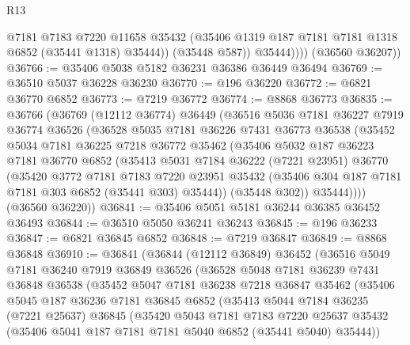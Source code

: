 \begin{lexlean}{R13}
\begin{coremodule}
                  @7181
                  @7183
                  @7220
                  @11658
                  @35432
                  (@35406 @1319 @187 @7181 @7181 @1318 @6852 (@35441 @1318) @35444))
                (@35448 @587))
              @35444))))
      (@36560 @36207))
@36766 := @35406 @5038 @5182 @36231 @36386 @36449 @36494
@36769 := @36510 @5037 @36228 @36230
@36770 := @196 @36220
@36772 := @6821 @36770 @6852
@36773 := @7219 @36772
@36774 := @8868 @36773
@36835 := @36766
    (@36769
      (@12112 @36774)
      @36449
      (@36516
        @5036
        @7181
        @36227
        @7919
        @36774
        @36526
        (@36528
          @5035
          @7181
          @36226
          @7431
          @36773
          @36538
          (@35452
            @5034
            @7181
            @36225
            @7218
            @36772
            @35462
            (@35406
              @5032
              @187
              @36223
              @7181
              @36770
              @6852
              (@35413
                @5031
                @7184
                @36222
                (@7221 @23951)
                @36770
                (@35420
                  @3772
                  @7181
                  @7183
                  @7220
                  @23951
                  @35432
                  (@35406 @304 @187 @7181 @7181 @303 @6852 (@35441 @303) @35444))
                (@35448 @302))
              @35444))))
      (@36560 @36220))
@36841 := @35406 @5051 @5181 @36244 @36385 @36452 @36493
@36844 := @36510 @5050 @36241 @36243
@36845 := @196 @36233
@36847 := @6821 @36845 @6852
@36848 := @7219 @36847
@36849 := @8868 @36848
@36910 := @36841
    (@36844
      (@12112 @36849)
      @36452
      (@36516
        @5049
        @7181
        @36240
        @7919
        @36849
        @36526
        (@36528
          @5048
          @7181
          @36239
          @7431
          @36848
          @36538
          (@35452
            @5047
            @7181
            @36238
            @7218
            @36847
            @35462
            (@35406
              @5045
              @187
              @36236
              @7181
              @36845
              @6852
              (@35413
                @5044
                @7184
                @36235
                (@7221 @25637)
                @36845
                (@35420
                  @5043
                  @7181
                  @7183
                  @7220
                  @25637
                  @35432
                  (@35406 @5041 @187 @7181 @7181 @5040 @6852 (@35441 @5040) @35444))

\end{coremodule}
\end{lexlean}
